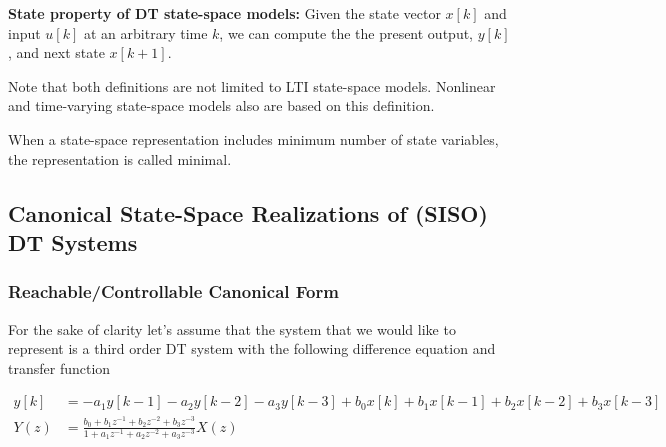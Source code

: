 \documentclass[twoside]{article}
\begin{document}
\textbf{State property of DT state-space models:} 
Given the state vector $x[k]$ and input $u[k]$ at an arbitrary time $k$, 
we can compute the the present output, $y[k]$, and next state $x[k+1]$.

Note that both definitions are not limited to LTI state-space models. 
Nonlinear and time-varying state-space models also are based on this 
definition. 

When a state-space representation includes minimum number of state 
variables, the representation is called minimal. 

\subsection*{Canonical State-Space Realizations of (SISO) DT Systems}

\subsubsection*{Reachable/Controllable Canonical Form}

For the sake of clarity let's assume that the system that we would
like to represent is a third order DT system with the following difference equation
and transfer function

\begin{align*}
y[k] &=  -a_1 y[k-1] - a_2 y[k-2] - a_3 y[k-3] 
+ b_0 x[k] + b_1 x[k-1] + b_2 x[k-2] + b_3 x[k-3] \\ 
Y(z) &= \frac{b_0 + b_1 z^{-1} + b_2 z^{-2} + b_3 z^{-3}}{1+ a_1 z^{-1} + a_2 z^{-2} + a_3 z^{-3}} X(z)
\end{align*}
\end{document}
